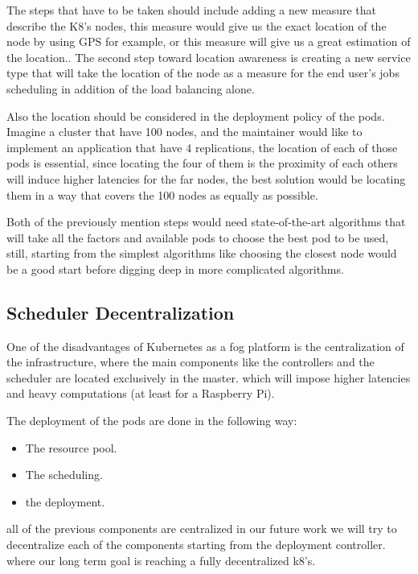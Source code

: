 \documentclass[letterpaper,twocolumn,10pt]{article}
\begin{document}
The steps that have to be taken should include adding a new measure that describe the K8's nodes, this measure would give us the exact location of the node by using GPS for example, or this measure will give us a great estimation of the location.. 
The second step toward location awareness is creating a new service type that will take the location of the node as a measure for the end user's jobs scheduling in addition of the load balancing alone.

Also the location should be considered in the deployment policy of the pods. Imagine a cluster that have 100 nodes, and the maintainer would like to implement an application that have 4 replications, the location of each of those pods is essential, since locating the four of them is the proximity of each others will induce higher latencies for the far nodes, the best solution would be locating them in a way that covers the 100 nodes as equally as possible. 

Both of the previously mention steps would need state-of-the-art algorithms that will take all the factors and available pods to choose the best pod to be used, still, starting from the simplest algorithms like choosing the closest node would be a good start before digging deep in more complicated algorithms.

\subsection{Scheduler Decentralization}

One of the disadvantages of Kubernetes as a fog platform is the centralization of the infrastructure, where the main components like the controllers and the scheduler are located exclusively in the master. which will impose higher latencies and heavy computations (at least for a Raspberry Pi). 

The deployment of the pods are done in the following way: 
\begin{itemize}
\item The resource pool. 
\item The scheduling. 
\item the deployment.
\end{itemize} 

all of the previous components are centralized in our future work we will try to decentralize each of the components starting from the deployment controller. 
where our long term goal is reaching a fully decentralized k8's. 
\end{document}
